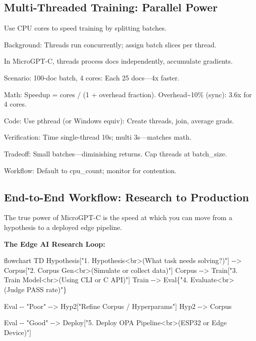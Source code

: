 \documentclass[
]{article}
\newenvironment{Shaded}{}{}
\newcommand{\NormalTok}[1]{#1}
\begin{document}
\subsection{Multi-Threaded Training: Parallel
Power}\label{multi-threaded-training-parallel-power}

Use CPU cores to speed training by splitting batches.

Background: Threads run concurrently; assign batch slices per thread.

In MicroGPT-C, threads process docs independently, accumulate gradients.

Scenario: 100-doc batch, 4 cores: Each 25 docs---4x faster.

Math: Speedup = cores / (1 + overhead fraction).
Overhead\textasciitilde10\% (sync): 3.6x for 4 cores.

Code: Use pthread (or Windows equiv): Create threads, join, average
grads.

Verification: Time single-thread 10s; multi 3s---matches math.

Tradeoff: Small batches---diminishing returns. Cap threads at
batch\_size.

Workflow: Default to cpu\_count; monitor for contention.

\subsection{End-to-End Workflow: Research to
Production}\label{end-to-end-workflow-research-to-production}

The true power of MicroGPT-C is the speed at which you can move from a
hypothesis to a deployed edge pipeline.

\textbf{The Edge AI Research Loop:}

\begin{Shaded}
\begin{Highlighting}[]
\NormalTok{flowchart TD}
\NormalTok{    Hypothesis["1. Hypothesis\textless{}br\textgreater{}(What task needs solving?)"] {-}{-}\textgreater{} Corpus["2. Corpus Gen\textless{}br\textgreater{}(Simulate or collect data)"]}
\NormalTok{    Corpus {-}{-}\textgreater{} Train["3. Train Model\textless{}br\textgreater{}(Using CLI or C API)"]}
\NormalTok{    Train {-}{-}\textgreater{} Eval\{"4. Evaluate\textless{}br\textgreater{}(Judge PASS rate)"\}}
    
\NormalTok{    Eval {-}{-} "Poor" {-}{-}\textgreater{} Hyp2["Refine Corpus / Hyperparams"]}
\NormalTok{    Hyp2 {-}{-}\textgreater{} Corpus}
    
\NormalTok{    Eval {-}{-} "Good" {-}{-}\textgreater{} Deploy["5. Deploy OPA Pipeline\textless{}br\textgreater{}(ESP32 or Edge Device)"]}
\end{Highlighting}
\end{Shaded}
\end{document}
